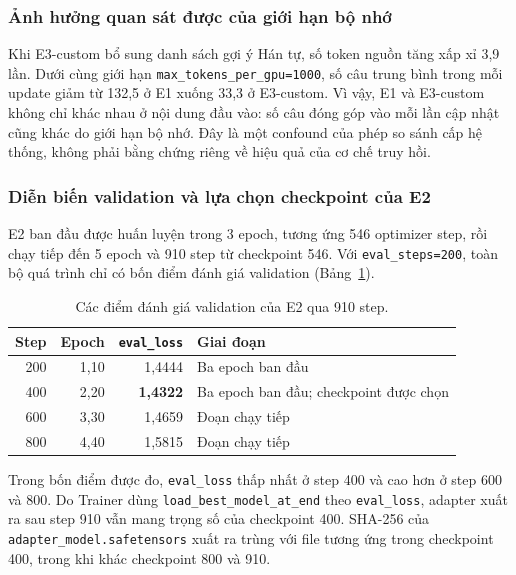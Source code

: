 \subsubsection{Ảnh hưởng quan sát được của giới hạn bộ nhớ}

Khi E3-custom bổ sung danh sách gợi ý Hán tự, số token nguồn tăng xấp xỉ
3,9 lần. Dưới cùng giới hạn \texttt{max\_tokens\_per\_gpu=1000}, số câu trung
bình trong mỗi update giảm từ 132,5 ở E1 xuống 33,3 ở E3-custom. Vì vậy, E1 và
E3-custom không chỉ khác nhau ở nội dung đầu vào: số câu đóng góp vào mỗi lần
cập nhật cũng khác do giới hạn bộ nhớ. Đây là một confound của phép so sánh cấp
hệ thống, không phải bằng chứng riêng về hiệu quả của cơ chế truy hồi.

\subsubsection{Diễn biến validation và lựa chọn checkpoint của E2}
\label{sec:e2-budget}

E2 ban đầu được huấn luyện trong 3 epoch, tương ứng 546 optimizer step, rồi chạy
tiếp đến 5 epoch và 910 step từ checkpoint 546. Với
\texttt{eval\_steps=200}, toàn bộ quá trình chỉ có bốn điểm đánh giá validation
(Bảng~\ref{tab:e2-budget}).

\begin{table}[tbp]
  \centering
  \small
  \renewcommand{\arraystretch}{1.18}
  \caption{Các điểm đánh giá validation của E2 qua 910 step.}
  \label{tab:e2-budget}
  \begin{tabularx}{\textwidth}{@{}rrrX@{}}
    \toprule
    \textbf{Step} & \textbf{Epoch} & \textbf{\texttt{eval\_loss}}
      & \textbf{Giai đoạn} \\
    \midrule
    200 & 1,10 & 1,4444 & Ba epoch ban đầu \\
    400 & 2,20 & \textbf{1,4322} & Ba epoch ban đầu; checkpoint được chọn \\
    600 & 3,30 & 1,4659 & Đoạn chạy tiếp \\
    800 & 4,40 & 1,5815 & Đoạn chạy tiếp \\
    \bottomrule
  \end{tabularx}
\end{table}

Trong bốn điểm được đo, \texttt{eval\_loss} thấp nhất ở step 400 và cao hơn ở
step 600 và 800. Do Trainer dùng \texttt{load\_best\_model\_at\_end} theo
\texttt{eval\_loss}, adapter xuất ra sau step 910 vẫn mang trọng số của
checkpoint 400. SHA-256 của \texttt{adapter\_model.safetensors} xuất ra trùng
với file tương ứng trong checkpoint 400, trong khi khác checkpoint 800 và 910.

